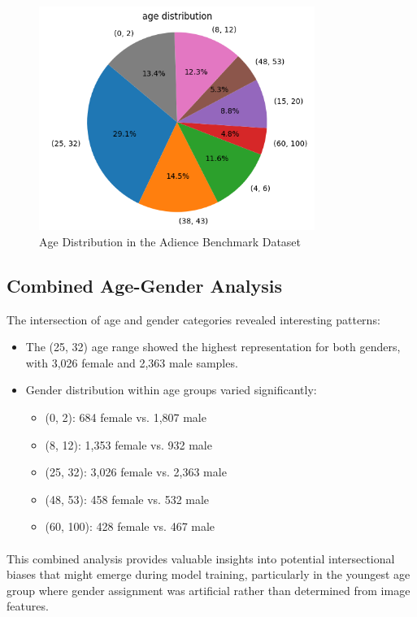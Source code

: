 \documentclass{article}
\begin{document}
\begin{figure}[H]
    \centering
    \includegraphics[width=0.8\textwidth]{assets/age distribution.png}
    \caption{Age Distribution in the Adience Benchmark Dataset}
\end{figure}


\subsection{Combined Age-Gender Analysis}

The intersection of age and gender categories revealed interesting patterns:

\begin{itemize}
    \item The (25, 32) age range showed the highest representation for both genders, with 3,026 female and 2,363 male samples.
    \item Gender distribution within age groups varied significantly:
    \begin{itemize}
        \item (0, 2): 684 female vs. 1,807 male 
        \item (8, 12): 1,353 female vs. 932 male
        \item (25, 32): 3,026 female vs. 2,363 male
        \item (48, 53): 458 female vs. 532 male
        \item (60, 100): 428 female vs. 467 male
    \end{itemize}
\end{itemize}

\paragraph{}
This combined analysis provides valuable insights into potential intersectional biases that might emerge during model training, particularly in the youngest age group where gender assignment was artificial rather than determined from image features.
\end{document}
